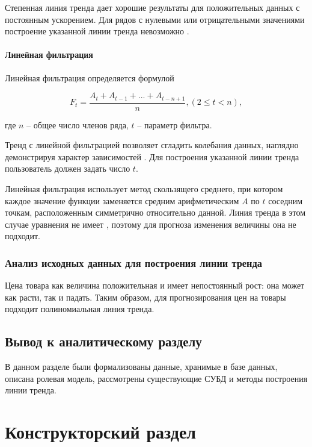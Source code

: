 \documentclass[a4paper,14pt]{extreport}
\begin{document}
Степенная линия тренда дает хорошие результаты для положительных данных с постоянным ускорением. Для рядов с нулевыми или отрицательными значениями построение указанной линии трен­да невозможно \cite{lt_exel}.

\subsubsection*{Линейная фильтрация}

Линейная фильтрация определяется формулой

\begin{equation}
	F_t = \frac{A_t + A_{t-1} + ... + A_{t-n+1}}{n}, (2 \leqslant t < n),
\end{equation}

где $n$ -- общее число членов ряда, $t$ -- параметр фильтра.

Тренд с линейной фильтрацией позволяет сгладить колебания данных, наглядно демонстрируя характер зависимостей \cite{lt_exel}. Для построения указанной линии тренда пользователь должен задать число $t$.

Линейная фильтрация использует метод скользящего среднего, при котором каждое значение функции заменяется средним арифметическим $A$ по $t$ соседним точкам, расположенным симметрично относительно данной. Линия тренда в этом случае уравнения не имеет \cite{lin_filt}, поэтому для прогноза изменения величины она не подходит.

\subsection{Анализ исходных данных для построения линии тренда}

Цена товара как величина положительная и имеет непостоянный рост: она может как расти, так и падать. Таким образом, для прогнозирования цен на товары подходит полиномиальная линия тренда.

\section*{Вывод к аналитическому разделу}

В данном разделе были формализованы данные, хранимые в базе данных, описана ролевая модель, рассмотрены существующие СУБД и методы построения линии тренда.



\chapter{Конструкторский раздел}
\end{document}
